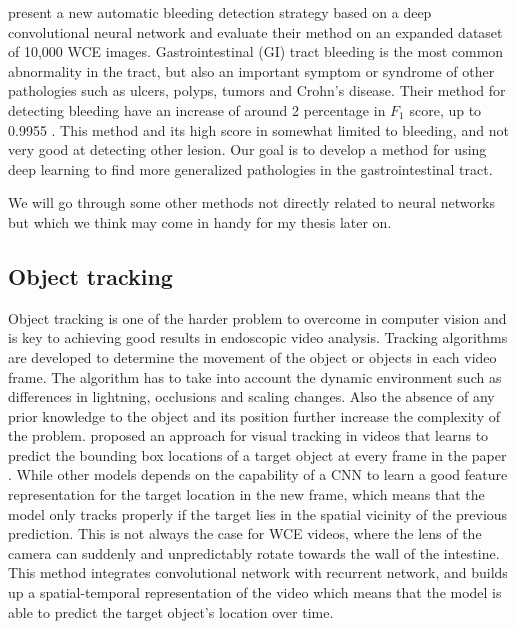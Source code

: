 \documentclass[thesis.tex]{subfiles}
\begin{document}
\medbreak
\citeauthor*{DeepConvolutional16} present a new automatic bleeding detection strategy based on a deep convolutional neural network and evaluate their method on an expanded dataset of 10,000 WCE images. Gastrointestinal (GI) tract bleeding is the most common abnormality in the tract, but also an important symptom or syndrome of other pathologies such as ulcers, polyps, tumors and Crohn's disease. Their method for detecting bleeding have an increase of around 2 percentage in $F_1$ score, up to 0.9955 \cite{DeepConvolutional16}. This method and its high score in somewhat limited to bleeding, and not very good at detecting other lesion. 
Our goal is to develop a method for using deep learning to find more generalized pathologies in the gastrointestinal tract.

\medbreak
We will go through some other methods not directly related to neural networks but which we think may come in handy for my thesis later on. 

\subsection{Object tracking}
Object tracking is one of the harder problem to overcome in computer vision and is key to achieving good results in endoscopic video analysis. Tracking algorithms are developed to determine the movement of the object or objects in each video frame. The algorithm has to take into account the dynamic environment such as differences in lightning, occlusions and scaling changes. Also the absence of any prior knowledge to the object and its position further increase the complexity of the problem. \citeauthor*{DeepReinforcement17} proposed an approach for visual tracking in videos that learns to predict the bounding box locations of a target object at every frame in the paper  \cite{DeepReinforcement17}. While other models depends on the capability of a CNN to learn a good feature representation for the target location in the new frame, which means that the model only tracks properly if the target lies in the spatial vicinity of the previous prediction. This is not always the case for WCE videos, where the lens of the camera can suddenly and unpredictably rotate towards the wall of the intestine. This method integrates convolutional network with recurrent network, and builds up a spatial-temporal representation of the video which means that the model is able to predict the target object's location over time.
\end{document}
